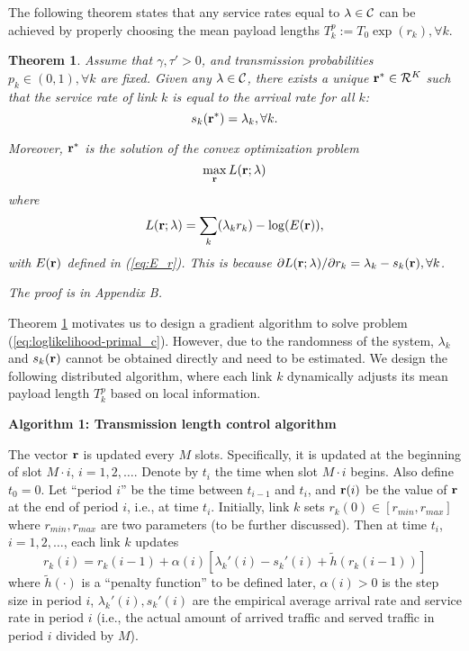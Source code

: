 \documentclass{IEEEtran}
\newtheorem{thm}{Theorem}
\begin{document}
The following theorem states that any service rates equal to ${\bf \lambda}\in{\cal C}$
can be achieved by properly choosing the mean payload lengths $T_{k}^{p}:=T_{0}\exp(r_{k}),\forall k$.
\begin{thm}
\label{thm:thu-optimal}Assume that $\gamma,\tau'>0$, and transmission
probabilities $p_{k}\in(0,1),\forall k$ are fixed. Given any ${\bf \lambda}\in{\cal C}$,
there exists a unique ${\bf r}^{*}\in{\cal R}^{K}$ such that the
service rate of link $k$ is equal to the arrival rate for all $k$:
\begin{equation}
s_{k}({\bf r}^{*})=\lambda_{k},\forall k.\label{eq:thu-optimal}\end{equation}


Moreover, ${\bf r}^{*}$ is the solution of the convex optimization
problem\begin{equation}
\max_{{\bf r}}L({\bf r};{\bf \lambda})\label{eq:loglikelihood-primal_c}\end{equation}
where \begin{equation}
L({\bf r};{\bf \lambda})=\sum_{k}(\lambda_{k}r_{k})-\log(E({\bf r})),\label{eq:Lr}\end{equation}
with $E({\bf r})$ defined in (\ref{eq:E_r}). This is because $\partial L({\bf r};{\bf \lambda})/\partial r_{k}=\lambda_{k}-s_{k}({\bf r}),\forall k$.

The proof is in Appendix B.
\end{thm}
Theorem \ref{thm:thu-optimal} motivates us to design a gradient algorithm
to solve problem (\ref{eq:loglikelihood-primal_c}). However, due
to the randomness of the system, $\lambda_{k}$ and $s_{k}({\bf r})$
cannot be obtained directly and need to be estimated. We design the
following distributed algorithm, where each link $k$ dynamically
adjusts its mean payload length $T_{k}^{p}$ based on local information.
\smallskip{}


\textbf{Algorithm 1: Transmission length control algorithm}

\medskip{}


The vector ${\bf r}$ is updated every $M$ slots. Specifically, it
is updated at the beginning of slot $M\cdot i$, $i=1,2,\dots$. Denote
by $t_{i}$ the time when slot $M\cdot i$ begins. Also define $t_{0}=0$.
Let {}``period $i$'' be the time between $t_{i-1}$ and $t_{i}$,
and ${\bf r}(i)$ be the value of ${\bf r}$ at the end of period
$i$, i.e., at time $t_{i}$. Initially, link $k$ sets $r_{k}(0)\in[r_{min},r_{max}]$
where $r_{min},r_{max}$ are two parameters (to be further discussed).
Then at time $t_{i}$, $i=1,2,\dots$, each link $k$ updates \begin{equation}
r_{k}(i)=r_{k}(i-1)+\alpha(i)[\lambda_{k}'(i)-s_{k}'(i)+\tilde{h}(r_{k}(i-1))]\label{eq:Alg1}\end{equation}
where $\tilde{h}(\cdot)$ is a {}``penalty function'' to be defined
later, $\alpha(i)>0$ is the step size in period $i$, $\lambda_{k}'(i),s_{k}'(i)$
are the empirical average arrival rate and service rate in period
$i$ (i.e., the actual amount of arrived traffic and served traffic
in period $i$ divided by $M$). 
\end{document}
